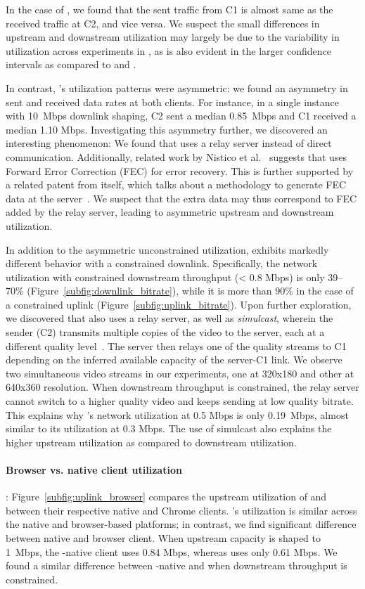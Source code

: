In the case of \teams, we found that the sent traffic from C1
is almost same as the received traffic at C2, and vice versa. 
We suspect the small
differences in upstream and downstream utilization may largely be due to the
variability in utilization across experiments in \teams, as is
also evident in the larger confidence intervals as compared to \zoom and \meet. 

In contrast, \zoom's utilization patterns were asymmetric: we found an
asymmetry in sent and received data rates at both clients. For instance, in a
single instance with 10~Mbps downlink shaping, C2 sent a median 0.85~Mbps and
C1 received a median 1.10 Mbps. Investigating this asymmetry further, we
discovered an interesting phenomenon: We found that \zoom uses a relay server
instead of direct communication. Additionally, related work by Nistico et
al.~\cite{nistico2020comparative} suggests that \zoom uses Forward Error
Correction (FEC) for error recovery. This is further supported by a related
patent from \zoom itself, which talks about a methodology to generate FEC data
at the server~\cite{liu2019error}. We suspect that the extra data may thus
correspond to FEC added by the relay server, leading to asymmetric upstream and
downstream utilization.  

In addition to the asymmetric unconstrained utilization, \meet exhibits
markedly different behavior with a constrained downlink.
Specifically, the
network utilization with constrained downstream throughput (< 0.8 Mbps) is
only 39--70\%
(Figure~\ref{subfig:downlink_bitrate}), while it is more than $90\%$ in the
case of a constrained uplink (Figure~\ref{subfig:uplink_bitrate}). Upon
further exploration, we discovered that
\meet also uses a relay server, as well as
\textit{simulcast}, wherein the sender (C2) transmits multiple copies of the
video to the server, each at a different quality
level~\cite{nistico2020comparative}. The server then relays one of the quality
streams to C1 depending on the inferred available capacity of the server-C1
link. We observe two simultaneous video streams in our experiments, one at
320x180 and other at 640x360 resolution. When downstream throughput is
constrained, the relay
server cannot switch to a higher quality video and keeps sending at low
quality bitrate. This explains why \meet's network utilization at 0.5 Mbps is
only 0.19~Mbps, almost similar to its utilization at 0.3 Mbps.  The use of
simulcast also explains the higher upstream utilization as compared to
downstream utilization. 

\paragraph{Browser vs. native client utilization}:
Figure~\ref{subfig:uplink_browser} compares the upstream utilization of \zoom
and \teams between their respective native and Chrome clients. \zoom's
utilization is similar across the native and browser-based platforms; in
contrast, we find significant difference between \teams native and browser
client. When upstream capacity is shaped to 1~Mbps, the \teams-native client
uses 0.84 Mbps, whereas \teamsbrowser uses only 0.61 Mbps. We found a
similar difference between \teams-native and \teamsbrowser when downstream
throughput is constrained. 

